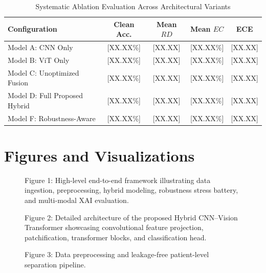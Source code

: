 \documentclass[conference]{IEEEtran}
\begin{document}
\begin{table}[htbp]
\caption{Systematic Ablation Evaluation Across Architectural Variants}
\label{tab:ablation_results}
\centering
\begin{tabular}{lcccc}
\toprule
\textbf{Configuration} & \textbf{Clean Acc.} & \textbf{Mean $RD$} & \textbf{Mean $EC$} & \textbf{ECE} \\
\midrule
Model A: CNN Only       & [XX.XX\%] & [XX.XX] & [XX.XX\%] & [XX.XX] \\
Model B: ViT Only       & [XX.XX\%] & [XX.XX] & [XX.XX\%] & [XX.XX] \\
Model C: Unoptimized Fusion & [XX.XX\%] & [XX.XX] & [XX.XX\%] & [XX.XX] \\
Model D: Full Proposed Hybrid & [XX.XX\%] & [XX.XX] & [XX.XX\%] & [XX.XX] \\
Model F: Robustness-Aware & [XX.XX\%] & [XX.XX] & [XX.XX\%] & [XX.XX] \\
\bottomrule
\end{tabular}
\end{table}

\section{Figures and Visualizations}
\label{sec:figures}

\begin{figure}[htbp]
\centering
\fbox{\rule{0pt}{1.8in} \rule{0.88\linewidth}{0pt}}
\caption{Figure 1: High-level end-to-end framework illustrating data ingestion, preprocessing, hybrid modeling, robustness stress battery, and multi-modal XAI evaluation.}
\label{fig:fig1}
\end{figure}

\begin{figure}[htbp]
\centering
\fbox{\rule{0pt}{1.8in} \rule{0.88\linewidth}{0pt}}
\caption{Figure 2: Detailed architecture of the proposed Hybrid CNN--Vision Transformer showcasing convolutional feature projection, patchification, transformer blocks, and classification head.}
\label{fig:fig2}
\end{figure}

\begin{figure}[htbp]
\centering
\fbox{\rule{0pt}{1.5in} \rule{0.88\linewidth}{0pt}}
\caption{Figure 3: Data preprocessing and leakage-free patient-level separation pipeline.}
\label{fig:fig3}
\end{figure}
\end{document}
